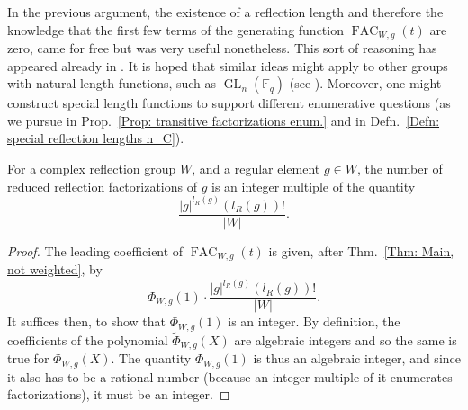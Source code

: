 \documentclass[ALCO, Unicode]{cedram}
\newcommand{\op}[1]{\operatorname{#1}}
\newcommand{\op}[1]{\operatorname{#1}}
\begin{document}
\begin{rema}
In the previous argument, the existence of a reflection length and therefore the knowledge that the first few terms of the generating function $\op{FAC}_{W,g}(t)$ are zero, came for free but was very useful nonetheless. This sort of reasoning has appeared already in \cite[end of proof of Thm.~2]{fpsac-paper-refl-length-trick}. It is hoped that similar ideas might apply to other groups with natural length functions, such as $\op{GL}_n(\mathbb{F}_q)$ (see \cite{lewis-morales-gln-fq-factorizations,reiner-lewis-stanton-singer-cycles}). Moreover, one might construct special length functions to support different enumerative questions (as we pursue in Prop.~\ref{Prop: transitive factorizations enum.} and in Defn.~\ref{Defn: special reflection lengths n_C}).  
\end{rema}

\begin{coro}\label{Corol: first of theorem}
For a complex reflection group $W$, and a regular element $g\in W$, the number of reduced reflection factorizations of $g$ is an integer multiple of the quantity 
\[
\dfrac{|g|^{l_R(g)}(l_R(g))!}{|W|}.
\]
\end{coro}
\begin{proof}
The leading coefficient of $\op{FAC}_{W,g}(t)$ is given, after Thm.~\ref{Thm: Main, not weighted}, by $$\Phi_{W,g}(1)\cdot\dfrac{|g|^{l_R(g)}(l_R(g))!}{|W|}.$$ It suffices then, to show that $\Phi_{W,g}(1)$ is an integer. By definition, the coefficients of the polynomial $\tilde{\Phi}_{W,g}(X)$ are algebraic integers and so the same is true for $\Phi_{W,g}(X)$. The quantity $\Phi_{W,g}(1)$ is thus an algebraic integer, and since it also has to be a rational number (because an integer multiple of it enumerates factorizations), it must be an integer.
\end{proof}
\end{document}
